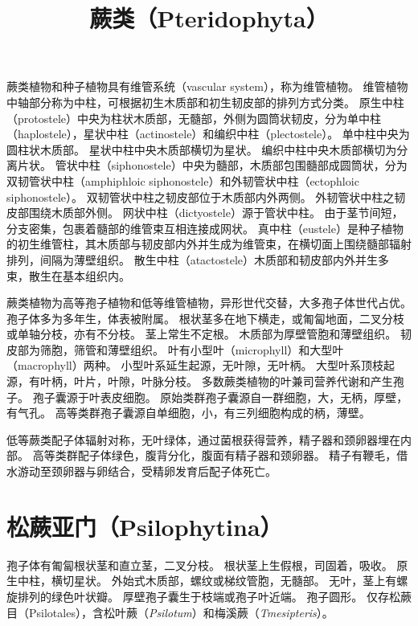 \documentclass[11pt]{article}
\title{蕨类（Pteridophyta）}
\author{}
\date{}
\begin{document}
\begin{sloppypar}
  \maketitle

  \linenumbers
蕨类植物和种子植物具有维管系统（vascular system），称为维管植物。
维管植物中轴部分称为中柱，可根据初生木质部和初生韧皮部的排列方式分类。
原生中柱（protostele）中央为柱状木质部，无髓部，外侧为圆筒状韧皮，分为单中柱（haplostele），星状中柱（actinostele）和编织中柱（plectostele）。
单中柱中央为圆柱状木质部。
星状中柱中央木质部横切为星状。
编织中柱中央木质部横切为分离片状。
管状中柱（siphonostele）中央为髓部，木质部包围髓部成圆筒状，分为双韧管状中柱（amphiphloic siphonostele）和外韧管状中柱（ectophloic siphonostele）。
双韧管状中柱之韧皮部位于木质部内外两侧。
外韧管状中柱之韧皮部围绕木质部外侧。
网状中柱（dictyostele）源于管状中柱。
由于茎节间短，分支密集，包裹着髓部的维管束互相连接成网状。
真中柱（eustele）是种子植物的初生维管柱，其木质部与韧皮部内外并生成为维管束，在横切面上围绕髓部辐射排列，间隔为薄壁组织。
散生中柱（atactostele）木质部和韧皮部内外并生多束，散生在基本组织内。

\par

蕨类植物为高等孢子植物和低等维管植物，异形世代交替，大多孢子体世代占优。
孢子体多为多年生，体表被附属。
根状茎多在地下横走，或匍匐地面，二叉分枝或单轴分枝，亦有不分枝。
茎上常生不定根。
木质部为厚壁管胞和薄壁组织。
韧皮部为筛胞，筛管和薄壁组织。
叶有小型叶（microphyll）和大型叶（macrophyll）两种。
小型叶系延生起源，无叶隙，无叶柄。
大型叶系顶枝起源，有叶柄，叶片，叶隙，叶脉分枝。
多数蕨类植物的叶兼司营养代谢和产生孢子。
孢子囊源于叶表皮细胞。
原始类群孢子囊源自一群细胞，大，无柄，厚壁，有气孔。
高等类群孢子囊源自单细胞，小，有三列细胞构成的柄，薄壁。

\par

低等蕨类配子体辐射对称，无叶绿体，通过菌根获得营养，精子器和颈卵器埋在内部。
高等类群配子体绿色，腹背分化，腹面有精子器和颈卵器。
精子有鞭毛，借水游动至颈卵器与卵结合，受精卵发育后配子体死亡。

\section{松蕨亚门（Psilophytina）}
孢子体有匍匐根状茎和直立茎，二叉分枝。
根状茎上生假根，司固着，吸收。
原生中柱，横切星状。
外始式木质部，螺纹或梯纹管胞，无髓部。
无叶，茎上有螺旋排列的绿色叶状瓣。
厚壁孢子囊生于枝端或孢子叶近端。
孢子圆形。
仅存松蕨目（Psilotales），含松叶蕨（\textit{Psilotum}）和梅溪蕨（\textit{Tmesipteris}）。


\end{sloppypar}
\end{document}
